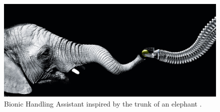 \begin{figure}[H]
    \centering
    \includegraphics[width = \textwidth]{Figures/BHAelephant.jpg}
    \caption{Bionic Handling Assistant inspired by the trunk of an elephant \cite{BHA}.}
    \label{fig:BHA}
\end{figure}


